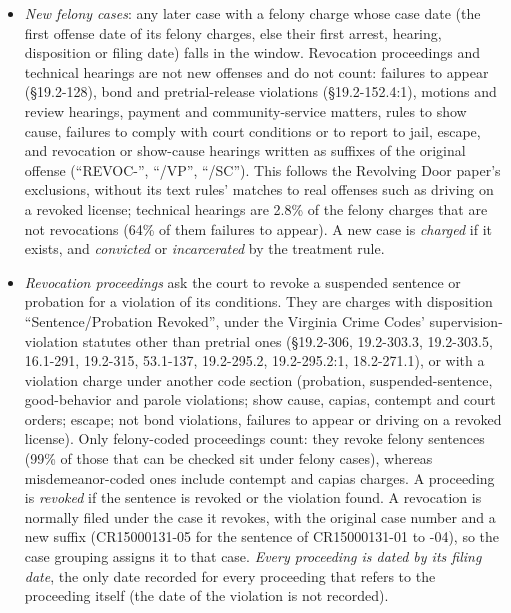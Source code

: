 \documentclass[11pt]{article}
\begin{document}
\begin{itemize}
  \item \emph{New felony cases}: any later case with a felony charge whose case date (the first offense date of its felony charges, else their first arrest, hearing, disposition or filing date) falls in the window. Revocation proceedings and technical hearings are not new offenses and do not count: failures to appear (\S19.2-128), bond and pretrial-release violations (\S19.2-152.4:1), motions and review hearings, payment and community-service matters, rules to show cause, failures to comply with court conditions or to report to jail, escape, and revocation or show-cause hearings written as suffixes of the original offense (``REVOC-'', ``/VP'', ``/SC''). This follows the Revolving Door paper's exclusions, without its text rules' matches to real offenses such as driving on a revoked license; technical hearings are 2.8\% of the felony charges that are not revocations (64\% of them failures to appear). A new case is \emph{charged} if it exists, and \emph{convicted} or \emph{incarcerated} by the treatment rule.
  \item \emph{Revocation proceedings} ask the court to revoke a suspended sentence or probation for a violation of its conditions. They are charges with disposition ``Sentence/Probation Revoked'', under the Virginia Crime Codes' supervision-violation statutes other than pretrial ones (\S19.2-306, 19.2-303.3, 19.2-303.5, 16.1-291, 19.2-315, 53.1-137, 19.2-295.2, 19.2-295.2:1, 18.2-271.1), or with a violation charge under another code section (probation, suspended-sentence, good-behavior and parole violations; show cause, capias, contempt and court orders; escape; not bond violations, failures to appear or driving on a revoked license). Only felony-coded proceedings count: they revoke felony sentences (99\% of those that can be checked sit under felony cases), whereas misdemeanor-coded ones include contempt and capias charges. A proceeding is \emph{revoked} if the sentence is revoked or the violation found. A revocation is normally filed under the case it revokes, with the original case number and a new suffix (CR15000131-05 for the sentence of CR15000131-01 to -04), so the case grouping assigns it to that case. \emph{Every proceeding is dated by its filing date}, the only date recorded for every proceeding that refers to the proceeding itself (the date of the violation is not recorded).

\end{itemize}
\end{document}
